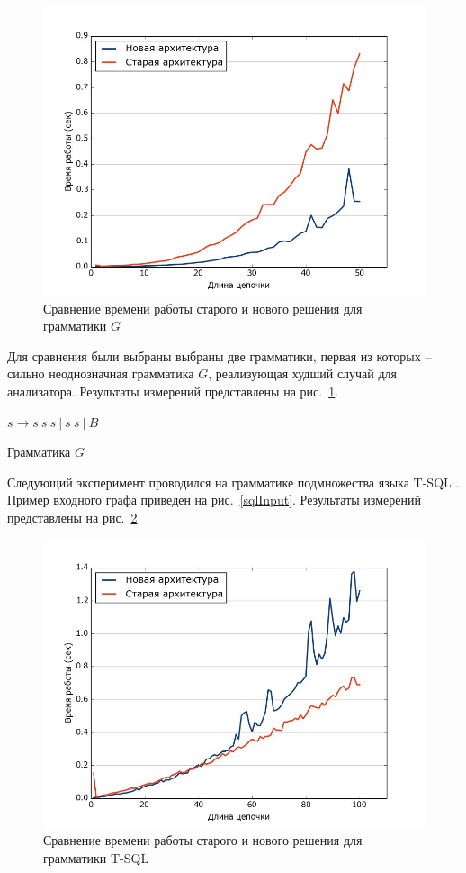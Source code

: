 \documentclass[14pt]{matmex-diploma}
\begin{document}
\begin{figure}[H]
 \includegraphics[width=\textwidth]{images/BBB.jpg}
 \caption{Сравнение времени работы старого и нового решения для грамматики $G$}
 \label{exp1}
\end{figure}
Для сравнения были выбраны выбраны две грамматики, первая из которых -- сильно неоднозначная грамматика $G$, реализующая худший случай для анализатора. Результаты измерений представлены на рис.~\ref{exp1}.

\begin{center}
\begin{listing}
$s \rightarrow s \ s \ s \ |  \ s \ s \ | \ B$
\label{grmG}
\caption{Грамматика $G$}
\end{listing}
\end{center}

Следующий эксперимент проводился на грамматике подмножества языка T-SQL \cite{GrammarZoo}. Пример входного графа приведен на рис.~\ref{sqlInput}. Результаты измерений представлены на рис.~\ref{exp2}

\begin{figure}[H]
 \includegraphics[width=\textwidth]{images/MsSql.jpg}
 \caption{Сравнение времени работы старого и нового решения для грамматики T-SQL}
 \label{exp2}
\end{figure}
\end{document}
